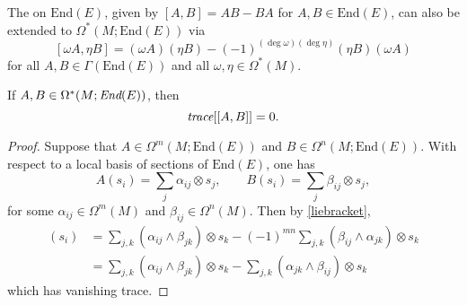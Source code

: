 \documentclass[a4paper,openany]{scrbook}
\begin{document}
The  on $\text{End}(E)$, given by $[A,B]=AB-BA$ for $A,B\in\text{End}(E)$, can also be extended to $\Omega^*(M;\text{End}(E))$ via
\begin{equation}\label{liebracket}
[\omega A,\eta B]=(\omega A)(\eta B)-(-1)^{(\deg\omega)(\deg\eta)}(\eta B)(\omega A)
\end{equation}
for all $A,B\in\Gamma(\text{End}(E))$ and all $\omega,\eta\in\Omega^*(M)$.

\begin{lemma}\label{tracelie}
If $A,B\in\Omega^*(M;\emph{End}(E))$, then
\begin{equation}
\emph{trace}[[A,B]]=0.
\end{equation}
\end{lemma}
\begin{proof}
Suppose that $A\in\Omega^m(M;\text{End}(E))$ and $B\in\Omega^n(M;\text{End}(E))$. With respect to a local basis of sections of $\text{End}(E)$, one has
\begin{equation*}
A(s_i)=\sum_j\alpha_{ij}\otimes s_j,\qquad B(s_i)=\sum_j\beta_{ij}\otimes s_j,
\end{equation*}
for some $\alpha_{ij}\in\Omega^m(M)$ and $\beta_{ij}\in\Omega^n(M)$. Then by \eqref{liebracket},
\begin{align*}
[A,B](s_i)&=\sum_{j,k}(\alpha_{ij}\wedge\beta_{jk})\otimes s_k-(-1)^{mn}\sum_{j,k}(\beta_{ij}\wedge\alpha_{jk})\otimes s_k\\
&=\sum_{j,k}(\alpha_{ij}\wedge\beta_{jk})\otimes s_k-\sum_{j,k}(\alpha_{jk}\wedge\beta_{ij})\otimes s_k
\end{align*}
which has vanishing trace.
\end{proof}
\end{document}
